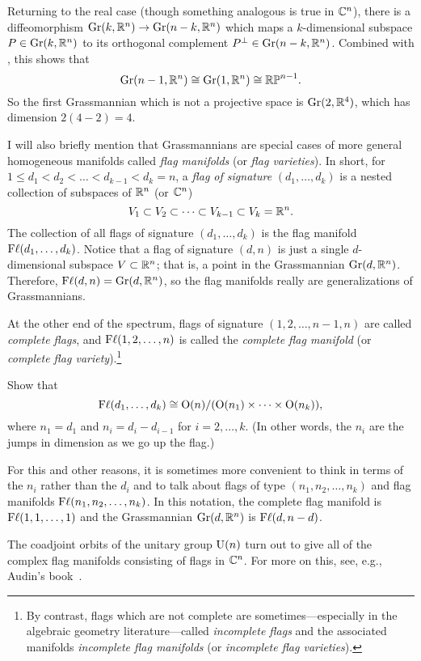 \begin{remark}
	Returning to the real case (though something analogous is true in $\mathbb{C}^n$), there is a diffeomorphism $\operatorname{Gr}(k,\mathbb{R}^n) \to \operatorname{Gr}(n-k,\mathbb{R}^n)$ which maps a $k$-dimensional subspace $P \in \operatorname{Gr}(k,\mathbb{R}^n)$ to its orthogonal complement $P^\bot \in \operatorname{Gr}(n-k,\mathbb{R}^n)$. Combined with , this shows that
	\[
		\operatorname{Gr}(n-1,\mathbb{R}^n) \cong \operatorname{Gr}(1,\mathbb{R}^n) \cong \mathbb{RP}^{n-1}.
	\]
	So the first Grassmannian which is not a projective space is $\operatorname{Gr}(2,\mathbb{R}^4)$, which has dimension $2(4-2) = 4$.
\end{remark}

I will also briefly mention that Grassmannians are special cases of more general homogeneous manifolds called \emph{flag manifolds} (or \emph{flag varieties}). In short, for $1 \leq d_1 < d_2 < \dots < d_{k-1} < d_k = n$, a \emph{flag of signature} $(d_1, \dots , d_k)$ is a nested collection of subspaces of $\mathbb{R}^n$ (or $\mathbb{C}^n$)
\[
	V_1 \subset V_2 \subset \dots \subset V_{k-1} \subset V_k = \mathbb{R}^n.
\]
The collection of all flags of signature $(d_1, \dots , d_k)$ is the flag manifold $\operatorname{F\ell}(d_1, \dots , d_k)$. Notice that a flag of signature $(d,n)$ is just a single $d$-dimensional subspace $V \subset \mathbb{R}^n$; that is, a point in the Grassmannian $\operatorname{Gr}(d,\mathbb{R}^n)$. Therefore, $\operatorname{F\ell}(d,n) = \operatorname{Gr}(d,\mathbb{R}^n)$, so the flag manifolds really are generalizations of Grassmannians.

At the other end of the spectrum, flags of signature $(1,2,\dots , n-1,n)$ are called \emph{complete flags}, and $\operatorname{F\ell}(1,2,\dots , n)$ is called the \emph{complete flag manifold} (or \emph{complete flag variety}).\footnote{By contrast, flags which are not complete are sometimes—especially in the algebraic geometry literature—called \emph{incomplete flags} and the associated manifolds \emph{incomplete flag manifolds} (or \emph{incomplete flag varieties}).}

\begin{exercise}
	Show that 
	\[
		\operatorname{F\ell}(d_1, \dots, d_k) \cong \operatorname{O}(n)/(\operatorname{O}(n_1) \times \dots \times \operatorname{O}(n_k)),
	\]
	where $n_1 = d_1$ and $n_i = d_i - d_{i-1}$ for $i=2, \dots , k$. (In other words, the $n_i$ are the jumps in dimension as we go up the flag.)
\end{exercise}


\begin{remark}
	For this and other reasons, it is sometimes more convenient to think in terms of the $n_i$ rather than the $d_i$ and to talk about flags of type $(n_1, n_2, \dots , n_k)$ and flag manifolds $\operatorname{F\ell}(n_1, n_2, \dots , n_k)$. In this notation, the complete flag manifold is $\operatorname{F\ell}(1,1, \dots , 1)$ and the Grassmannian $\operatorname{Gr}(d,\mathbb{R}^n)$ is $\operatorname{F\ell}(d,n-d)$.
\end{remark}

The coadjoint orbits of the unitary group $\operatorname{U}(n)$ turn out to give all of the complex flag manifolds consisting of flags in $\mathbb{C}^n$. For more on this, see, e.g., Audin's book~\cite[\S II.1.d]{audinTorusActionsSymplectic2004}.